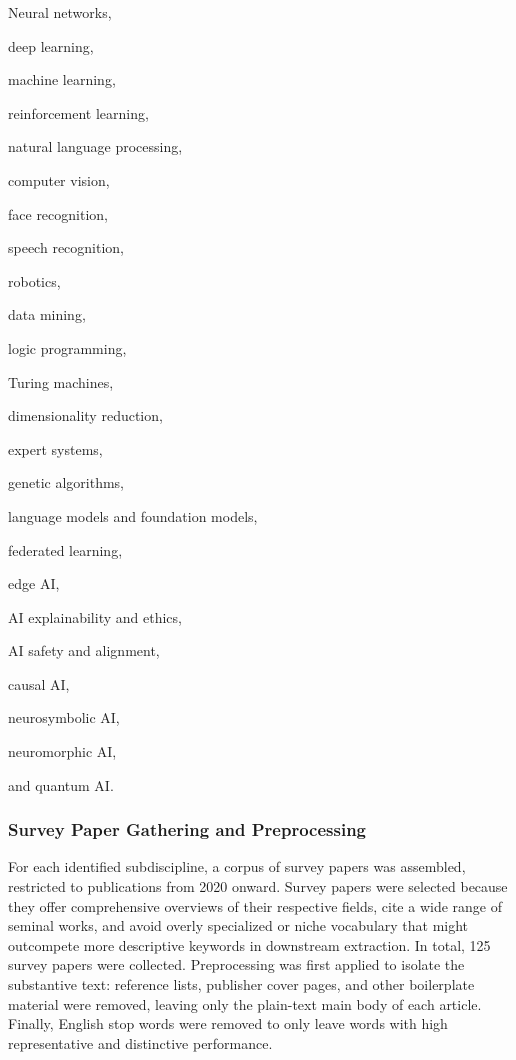 \documentclass{article}
\begin{document}
\begin{inparaenum}[(1)]
	\item Neural networks,
	\item deep learning,
	\item machine learning,
	\item reinforcement learning,
	\item natural language processing,
	\item computer vision,
	\item face recognition,
	\item speech recognition,
	\item robotics,
	\item data mining,
	\item logic programming,
	\item Turing machines,
	\item dimensionality reduction,
	\item expert systems,
	\item genetic algorithms,
	\item language models and foundation models,
	\item federated learning,
	\item edge AI,
	\item AI explainability and ethics,
	\item AI safety and alignment,
	\item causal AI,
	\item neurosymbolic AI,
	\item neuromorphic AI,
	\item and quantum AI.
\end{inparaenum}

\subsubsection{Survey Paper Gathering and Preprocessing}

For each identified subdiscipline, a corpus of survey papers was assembled, restricted to publications from 2020 onward. Survey papers were selected because they offer comprehensive overviews of their respective fields, cite a wide range of seminal works, and avoid overly specialized or niche vocabulary that might outcompete more descriptive keywords in downstream extraction. In total, 125 survey papers were collected. Preprocessing was first applied to isolate the substantive text: reference lists, publisher cover pages, and other boilerplate material were removed, leaving only the plain-text main body of each article. Finally, English stop words were removed to only leave words with high representative and distinctive performance. 
\end{document}
